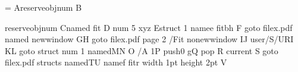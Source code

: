 \documentclass{article}
\begin{document}
=\font
A\pdfobj reserveobjnum B\pdfannot reserveobjnum C\pdfdest name{d} fit D%
\pdfdest num 5 xyz E\pdfdest struct 1 name{e} fitbh F%
\pdfstartlink goto file{x.pdf} name{d} newwindow G\pdfendlink H%
\pdfstartlink goto file{x.pdf} page 2 {/Fit} nonewwindow I\pdfendlink J%
\pdfstartlink user{/S/URI} K\pdfendlink L%
\pdfstartlink goto struct num 1 name{d}M\pdfendlink N%
\pdffontattr{}O\pdffontattr{} {/A 1}P%
 push{0 g}Q pop R current S%
\pdfstartlink goto file{x.pdf} struct{s} name{d}T\pdfendlink U%
\pdfdest name{f} fitr width 1pt height 2pt V
\end{document}
